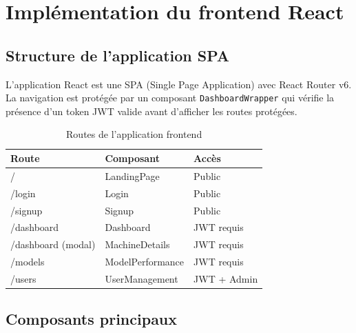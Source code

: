 \section{Implémentation du frontend React}

\subsection{Structure de l'application SPA}

L'application React est une SPA (Single Page Application) avec React Router v6.
La navigation est protégée par un composant \texttt{DashboardWrapper} qui vérifie
la présence d'un token JWT valide avant d'afficher les routes protégées.

\begin{table}[H]
\centering
\caption{Routes de l'application frontend}
\begin{tabularx}{\textwidth}{|l|l|X|}
\hline
\rowcolor{lightblue}
\textbf{Route} & \textbf{Composant} & \textbf{Accès} \\
\hline
/ & LandingPage & Public \\
\hline
/login & Login & Public \\
\hline
/signup & Signup & Public \\
\hline
/dashboard & Dashboard & JWT requis \\
\hline
/dashboard (modal) & MachineDetails & JWT requis \\
\hline
/models & ModelPerformance & JWT requis \\
\hline
/users & UserManagement & JWT + Admin \\
\hline
\end{tabularx}
\end{table}

\subsection{Composants principaux}

